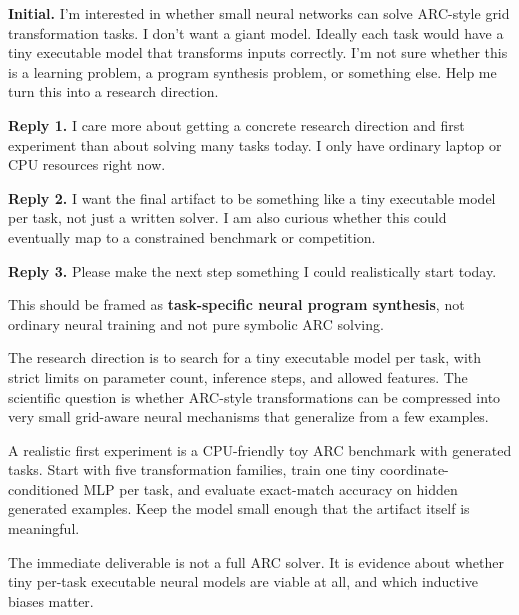 \begin{tcolorbox}[
  colback=orange!5,
  colframe=orange!50,
  title=User prompt,
  fonttitle=\bfseries\small,
  fontupper=\small,
  arc=2pt,
  boxsep=3pt,
  left=4pt, right=4pt, top=3pt, bottom=3pt
]
\textbf{Initial.} I'm interested in whether small neural networks can solve ARC-style grid transformation tasks. I don't want a giant model. Ideally each task would have a tiny executable model that transforms inputs correctly. I'm not sure whether this is a learning problem, a program synthesis problem, or something else. Help me turn this into a research direction.

\textbf{Reply 1.} I care more about getting a concrete research direction and first experiment than about solving many tasks today. I only have ordinary laptop or CPU resources right now.

\textbf{Reply 2.} I want the final artifact to be something like a tiny executable model per task, not just a written solver. I am also curious whether this could eventually map to a constrained benchmark or competition.

\textbf{Reply 3.} Please make the next step something I could realistically start today.
\end{tcolorbox}

\begin{tcolorbox}[
  colback=gray!6,
  colframe=gray!50,
  title=Baseline,
  fonttitle=\bfseries\small,
  fontupper=\small,
  arc=2pt,
  boxsep=3pt,
  left=4pt, right=4pt, top=3pt, bottom=3pt
]
This should be framed as \textbf{task-specific neural program synthesis}, not ordinary neural training and not pure symbolic ARC solving.

The research direction is to search for a tiny executable model per task, with strict limits on parameter count, inference steps, and allowed features. The scientific question is whether ARC-style transformations can be compressed into very small grid-aware neural mechanisms that generalize from a few examples.

A realistic first experiment is a CPU-friendly toy ARC benchmark with generated tasks. Start with five transformation families, train one tiny coordinate-conditioned MLP per task, and evaluate exact-match accuracy on hidden generated examples. Keep the model small enough that the artifact itself is meaningful.

The immediate deliverable is not a full ARC solver. It is evidence about whether tiny per-task executable neural models are viable at all, and which inductive biases matter.
\end{tcolorbox}

